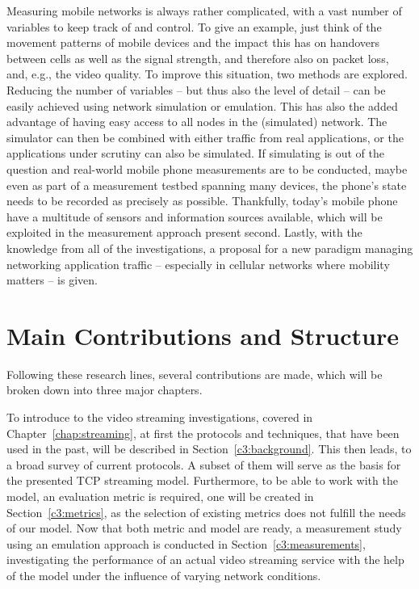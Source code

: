 Measuring mobile networks is always rather complicated, with a vast number of variables to keep track of and control. To give an example, just think of the movement patterns of mobile devices and the impact this has on handovers between cells as well as the signal strength, and therefore also on packet loss, and, e.g., the video quality.
 To improve this situation, two methods are explored. Reducing the number of variables -- but thus also the level of detail -- can be easily achieved using network simulation or emulation. This has also the added advantage of having easy access to all nodes in the (simulated) network. The simulator can then be combined with either traffic from real applications, or the applications under scrutiny can also be simulated.
 If simulating is out of the question and real-world mobile phone measurements are to be conducted, maybe even as part of a measurement testbed spanning many devices, the phone's state needs to be recorded as precisely as possible. Thankfully, today's mobile phone have a multitude of sensors and information sources available, which will be exploited in the measurement approach present second.
 Lastly, with the knowledge from all of the investigations, a proposal for a new paradigm managing networking application traffic -- especially in cellular networks where mobility matters -- is given.



\section{Main Contributions and Structure}

Following these research lines, several contributions are made, which will be broken down into three major chapters.

To introduce to the video streaming investigations, covered in Chapter~\ref{chap:streaming}, at first the protocols and techniques, that have been used in the past, will be described in Section~\ref{c3:background}. This then leads, to a broad survey of current protocols. A subset of them will serve as the basis for the presented \gls{TCP} streaming model. Furthermore, to be able to work with the model, an evaluation metric is required, one will be created in Section~\ref{c3:metrics}, as the selection of existing metrics does not fulfill the needs of our model. Now that both metric and model are ready, a measurement study using an emulation approach is conducted in Section~\ref{c3:measurements}, investigating the performance of an actual video streaming service with the help of the model under the influence of varying network conditions.

